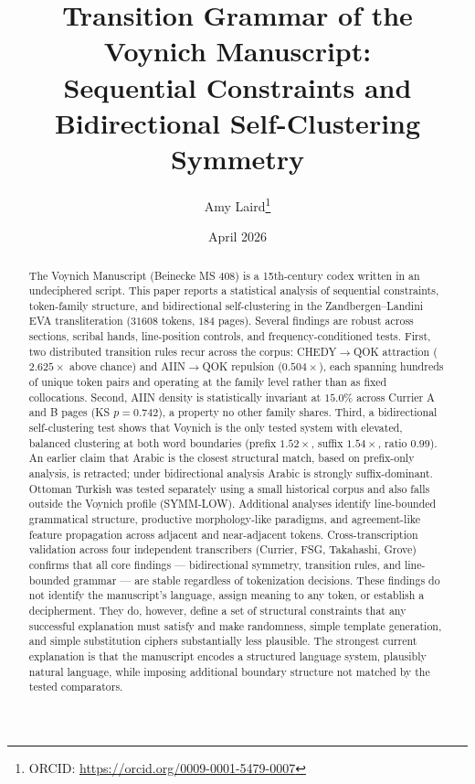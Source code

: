\documentclass[11pt]{article}
\title{\textbf{Transition Grammar of the Voynich Manuscript:\\
Sequential Constraints and Bidirectional Self-Clustering Symmetry}}
\author[1]{Amy Laird\thanks{ORCID: \url{https://orcid.org/0009-0001-5479-0007}}}
\affil[1]{Independent Researcher \\ \texttt{laird2214@gmail.com}}
\date{April 2026}
\begin{document}
\maketitle

\begin{abstract}
\noindent
The Voynich Manuscript (Beinecke MS 408) is a 15th-century codex written
in an undeciphered script. This paper reports a statistical analysis of
sequential constraints, token-family structure, and bidirectional
self-clustering in the Zandbergen--Landini EVA transliteration
($\num{31608}$ tokens, $184$ pages). Several findings are robust across
sections, scribal hands, line-position controls, and frequency-conditioned
tests. First, two distributed transition rules recur across the corpus:
CHEDY$\to$QOK attraction ($2.625\times$ above chance) and AIIN$\to$QOK
repulsion ($0.504\times$), each spanning hundreds of unique token pairs
and operating at the family level rather than as fixed collocations.
Second, AIIN density is statistically invariant at $15.0\%$ across
Currier A and B pages (KS $p = 0.742$), a property no other family
shares. Third, a bidirectional self-clustering test shows that Voynich
is the only tested system with elevated, balanced clustering at both word
boundaries (prefix $1.52\times$, suffix $1.54\times$, ratio $0.99$). An
earlier claim that Arabic is the closest structural match, based on
prefix-only analysis, is retracted; under bidirectional analysis Arabic
is strongly suffix-dominant. Ottoman Turkish was tested separately using
a small historical corpus and also falls outside the Voynich profile
(SYMM-LOW). Additional analyses identify line-bounded grammatical
structure, productive morphology-like paradigms, and agreement-like
feature propagation across adjacent and near-adjacent tokens. Cross-transcription validation across four independent transcribers
(Currier, FSG, Takahashi, Grove) confirms that all core findings ---
bidirectional symmetry, transition rules, and line-bounded grammar ---
are stable regardless of tokenization decisions. These
findings do not identify the manuscript's language, assign meaning to any
token, or establish a decipherment. They do, however, define a set of
structural constraints that any successful explanation must satisfy and
make randomness, simple template generation, and simple substitution
ciphers substantially less plausible. The strongest current explanation
is that the manuscript encodes a structured language system, plausibly
natural language, while imposing additional boundary structure not
matched by the tested comparators.
\end{abstract}
\end{document}
